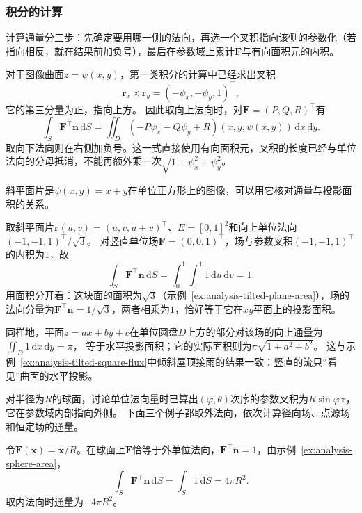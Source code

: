 \subsubsection{积分的计算}

计算通量分三步：先确定要用哪一侧的法向，再选一个叉积指向该侧的参数化（若指向相反，就在结果前加负号），最后在参数域上累计$\bm F$与有向面积元的内积。

对于图像曲面$z=\psi(x,y)$，第一类积分的计算中已经求出叉积
\[
 \bm r_x\times\bm r_y=(-\psi_x,-\psi_y,1)^\top,
\]
它的第三分量为正，指向上方。
因此取向上法向时，对$\bm F=(P,Q,R)^\top$有
\[
 \int_S\bm F^\top\bm n\,\mathrm dS
 =\iint_D(-P\psi_x-Q\psi_y+R)(x,y,\psi(x,y))\,\mathrm dx\,\mathrm dy.
\]
取向下法向则在右侧加负号。这一式直接使用有向面积元，叉积的长度已经与单位法向的分母抵消，不能再额外乘一次$\sqrt{1+\psi_x^2+\psi_y^2}$。

斜平面片是$\psi(x,y)=x+y$在单位正方形上的图像，可以用它核对通量与投影面积的关系。

\begin{example}[斜平面片上的竖直通量]
\label{ex:analysis-tilted-plane-flux}
取斜平面片$\bm r(u,v)=(u,v,u+v)^\top$、$E=[0,1]^2$和向上单位法向$(-1,-1,1)^\top/\sqrt3$。
对竖直单位场$\bm F=(0,0,1)^\top$，场与参数叉积$(-1,-1,1)^\top$的内积为$1$，故
\[
 \int_S\bm F^\top\bm n\,\mathrm dS
 =\int_0^1\int_0^1 1\,\mathrm du\,\mathrm dv=1.
\]
用面积分开看：这块面的面积为$\sqrt3$（示例~\ref{ex:analysis-tilted-plane-area}），场的法向分量为$\bm F^\top\bm n=1/\sqrt3$，两者相乘为$1$，恰好等于它在$xy$平面上的投影面积。
\end{example}

同样地，平面$z=ax+by+c$在单位圆盘$D$上方的部分对该场的向上通量为$\iint_D1\,\mathrm dx\,\mathrm dy=\pi$，
等于水平投影面积；它的实际面积则为$\pi\sqrt{1+a^2+b^2}$。
这与示例~\ref{ex:analysis-tilted-square-flux}中倾斜屋顶接雨的结果一致：竖直的流只“看见”曲面的水平投影。

对半径为$R$的球面，讨论单位法向量时已算出$(\varphi,\theta)$次序的参数叉积为$R\sin\varphi\,\bm r$，它在参数域内部指向外侧。
下面三个例子都取外法向，依次计算径向场、点源场和恒定场的通量。

\begin{example}[径向场穿过球面]
\label{ex:analysis-radial-field-sphere-flux}
令$\bm F(\bm x)=\bm x/R$。在球面上$\bm F$恰等于外单位法向，$\bm F^\top\bm n=1$，由示例~\ref{ex:analysis-sphere-area}，
\[
 \int_S\bm F^\top\bm n\,\mathrm dS
 =\int_S1\,\mathrm dS=4\pi R^2.
\]
取内法向时通量为$-4\pi R^2$。
\end{example}

